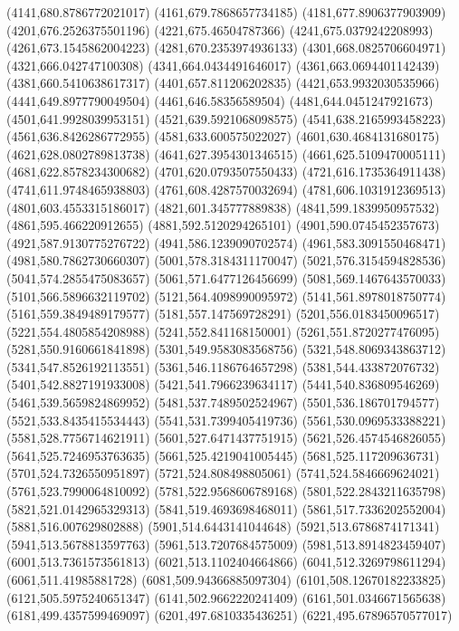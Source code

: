{(4141,680.8786772021017)
(4161,679.7868657734185)
(4181,677.8906377903909)
(4201,676.2526375501196)
(4221,675.46504787366)
(4241,675.0379242208993)
(4261,673.1545862004223)
(4281,670.2353974936133)
(4301,668.0825706604971)
(4321,666.042747100308)
(4341,664.0434491646017)
(4361,663.0694401142439)
(4381,660.5410638617317)
(4401,657.811206202835)
(4421,653.9932030535966)
(4441,649.8977790049504)
(4461,646.58356589504)
(4481,644.0451247921673)
(4501,641.9928039953151)
(4521,639.5921068098575)
(4541,638.2165993458223)
(4561,636.8426286772955)
(4581,633.600575022027)
(4601,630.4684131680175)
(4621,628.0802789813738)
(4641,627.3954301346515)
(4661,625.5109470005111)
(4681,622.8578234300682)
(4701,620.0793507550433)
(4721,616.1735364911438)
(4741,611.9748465938803)
(4761,608.4287570032694)
(4781,606.1031912369513)
(4801,603.4553315186017)
(4821,601.345777889838)
(4841,599.1839950957532)
(4861,595.466220912655)
(4881,592.5120294265101)
(4901,590.0745452357673)
(4921,587.9130775276722)
(4941,586.1239090702574)
(4961,583.3091550468471)
(4981,580.7862730660307)
(5001,578.3184311170047)
(5021,576.3154594828536)
(5041,574.2855475083657)
(5061,571.6477126456699)
(5081,569.1467643570033)
(5101,566.5896632119702)
(5121,564.4098990095972)
(5141,561.8978018750774)
(5161,559.3849489179577)
(5181,557.147569728291)
(5201,556.0183450096517)
(5221,554.4805854208988)
(5241,552.841168150001)
(5261,551.8720277476095)
(5281,550.9160661841898)
(5301,549.9583083568756)
(5321,548.8069343863712)
(5341,547.8526192113551)
(5361,546.1186764657298)
(5381,544.433872076732)
(5401,542.8827191933008)
(5421,541.7966239634117)
(5441,540.836809546269)
(5461,539.5659824869952)
(5481,537.7489502524967)
(5501,536.186701794577)
(5521,533.8435415534443)
(5541,531.7399405419736)
(5561,530.0969533388221)
(5581,528.7756714621911)
(5601,527.6471437751915)
(5621,526.4574546826055)
(5641,525.7246953763635)
(5661,525.4219041005445)
(5681,525.117209636731)
(5701,524.7326550951897)
(5721,524.808498805061)
(5741,524.5846669624021)
(5761,523.7990064810092)
(5781,522.9568606789168)
(5801,522.2843211635798)
(5821,521.0142965329313)
(5841,519.4693698468011)
(5861,517.7336202552004)
(5881,516.007629802888)
(5901,514.6443141044648)
(5921,513.6786874171341)
(5941,513.5678813597763)
(5961,513.7207684575009)
(5981,513.8914823459407)
(6001,513.7361573561813)
(6021,513.1102404664866)
(6041,512.3269798611294)
(6061,511.41985881728)
(6081,509.94366885097304)
(6101,508.12670182233825)
(6121,505.5975240651347)
(6141,502.9662220241409)
(6161,501.0346671565638)
(6181,499.4357599469097)
(6201,497.6810335436251)
(6221,495.67896570577017)
}
